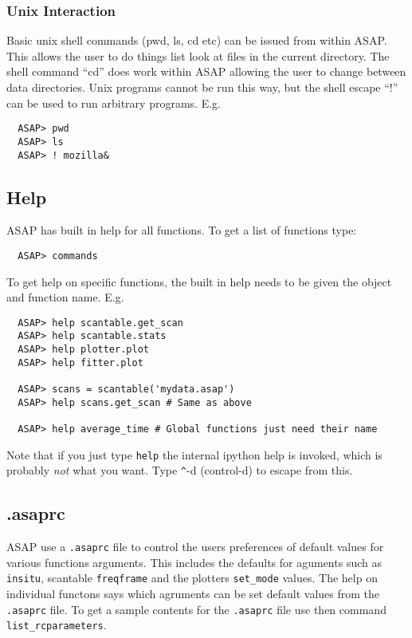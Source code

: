 \documentclass[11pt]{article}
\newcommand{\cmd}[1]{{\tt #1}}
\begin{document}
\subsubsection{Unix Interaction}

Basic unix shell commands (pwd, ls, cd etc) can be issued from within
ASAP. This allows the user to do things list look at files in the
current directory. The shell command ``cd'' does work within ASAP
allowing the user to change between data directories. Unix programs
cannot be run this way, but the shell escape ``$!$'' can be used to run
arbitrary programs. E.g.

\begin{verbatim}
  ASAP> pwd
  ASAP> ls
  ASAP> ! mozilla&
\end{verbatim}

\subsection{Help}

ASAP has built in help for all functions. To get a list of functions type:

\begin{verbatim}
  ASAP> commands
\end{verbatim}

To get help on specific functions, the built in help needs to be given
the object and function name. E.g.

\begin{verbatim}
  ASAP> help scantable.get_scan
  ASAP> help scantable.stats
  ASAP> help plotter.plot
  ASAP> help fitter.plot

  ASAP> scans = scantable('mydata.asap')
  ASAP> help scans.get_scan # Same as above

  ASAP> help average_time # Global functions just need their name

\end{verbatim}

Note that if you just type \cmd{help} the internal ipython help is
invoked, which is probably {\em not} what you want. Type \verb+^+-d
(control-d) to escape from this.

\subsection{.asaprc}

ASAP use a \cmd{.asaprc} file to control the users preferences of
default values for various functions arguments. This includes the
defaults for aguments such as \cmd{insitu}, scantable \cmd{freqframe}
and the plotters \cmd{set\_mode} values. The help on individual
functons says which agruments can be set default values from the
\cmd{.asaprc} file. To get a sample contents for the \cmd{.asaprc}
file use then command \cmd{list\_rcparameters}.
\end{document}
